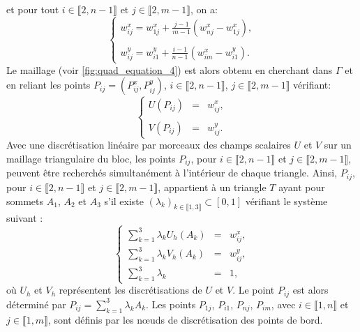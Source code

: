 et pour tout $i\in\llbracket 2, n-1\rrbracket$ et $j\in\llbracket 2, m-1\rrbracket$, on a:
\begin{equation}
\left\{
\begin{array}{ll}
w_{ij}^x=w_{1j}^x+\displaystyle\frac{j-1}{m-1}\left(w_{nj}^x-w_{1j}^x\right),\\\\
w_{ij}^y=w_{i1}^y+\displaystyle\frac{i-1}{n-1}\left(w_{im}^x-w_{i1}^y\right).
\end{array}
\right.
\end{equation}
Le maillage (voir \ref{fig:quad_equation_4}) est alors obtenu en cherchant dans $\Gamma$ et en reliant les points $P_{ij}=(P_{ij}^x, P_{ij}^y)$, $i\in\llbracket 2, n-1\rrbracket$, $j\in\llbracket 2, m-1\rrbracket$ vérifiant:
\begin{equation}
\left\{
\begin{array}{lcl}
U(P_{ij})&=&w_{ij}^x,\\\\
V(P_{ij})&=&w_{ij}^y.
\end{array}
\right.
\end{equation}
Avec une discrétisation linéaire par morceaux des champs scalaires $U$ et $V$ sur un maillage triangulaire du bloc, les points $P_{ij}$, pour $i \in \llbracket 2, n-1 \rrbracket$ et $j \in \llbracket 2, m-1 \rrbracket$, peuvent être recherchés simultanément à l'intérieur de chaque triangle. Ainsi, $P_{ij}$, pour $i \in \llbracket 2, n-1 \rrbracket$ et $j \in \llbracket 2, m-1 \rrbracket$, appartient à un triangle $T$ ayant pour sommets $A_1$, $A_2$ et $A_3$ s'il existe $(\lambda_k)_{k \in \llbracket 1, 3 \rrbracket} \subset [0, 1]$ vérifiant le système suivant :
\begin{equation}
\left\{
\begin{array}{lcl}
\displaystyle\sum_{k=1}^3\lambda_k U_h(A_k) & = & w_{ij}^x,\\
\displaystyle\sum_{k=1}^3\lambda_k V_h(A_k) & = & w_{ij}^y,\\
\displaystyle\sum_{k=1}^3\lambda_k & = & 1,
\end{array}
\right.
\end{equation}
où $U_h$ et $V_h$ représentent les discrétisations de $U$ et $V$. Le point $P_{ij}$ est alors déterminé par $P_{ij}=\sum_{k=1}^3\lambda_kA_k$. Les points $P_{1j}$, $P_{i1}$, $P_{nj}$, $P_{im}$, avec $i \in \llbracket 1, n \rrbracket$ et $j \in \llbracket 1, m \rrbracket$, sont définis par les nœuds de discrétisation des points de bord.
